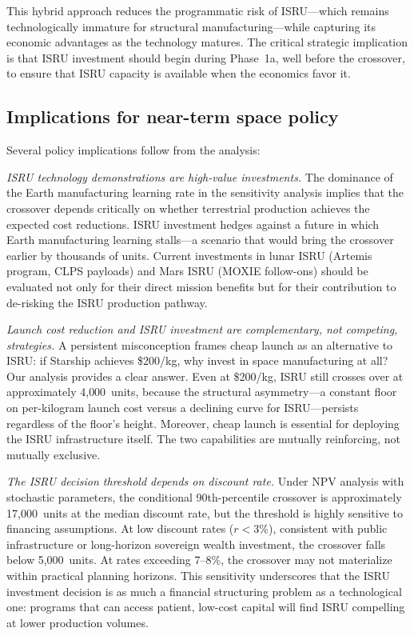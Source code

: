 \documentclass[preprint,12pt]{elsarticle}
\begin{document}
This hybrid approach reduces the programmatic risk of ISRU---which remains technologically immature for structural manufacturing---while capturing its economic advantages as the technology matures. The critical strategic implication is that ISRU investment should begin during Phase~1a, well before the crossover, to ensure that ISRU capacity is available when the economics favor it.

\subsection{Implications for near-term space policy}

Several policy implications follow from the analysis:

\emph{ISRU technology demonstrations are high-value investments.} The dominance of the Earth manufacturing learning rate in the sensitivity analysis implies that the crossover depends critically on whether terrestrial production achieves the expected cost reductions. ISRU investment hedges against a future in which Earth manufacturing learning stalls---a scenario that would bring the crossover earlier by thousands of units. Current investments in lunar ISRU (Artemis program, CLPS payloads) and Mars ISRU (MOXIE follow-ons) should be evaluated not only for their direct mission benefits but for their contribution to de-risking the ISRU production pathway.

\emph{Launch cost reduction and ISRU investment are complementary, not competing, strategies.} A persistent misconception frames cheap launch as an alternative to ISRU: if Starship achieves \$200/kg, why invest in space manufacturing at all? Our analysis provides a clear answer. Even at \$200/kg, ISRU still crosses over at approximately 4{,}000~units, because the structural asymmetry---a constant floor on per-kilogram launch cost versus a declining curve for ISRU---persists regardless of the floor's height. Moreover, cheap launch is essential for deploying the ISRU infrastructure itself. The two capabilities are mutually reinforcing, not mutually exclusive.

\emph{The ISRU decision threshold depends on discount rate.} Under NPV analysis with stochastic parameters, the conditional 90th-percentile crossover is approximately 17{,}000~units at the median discount rate, but the threshold is highly sensitive to financing assumptions. At low discount rates ($r < 3\%$), consistent with public infrastructure or long-horizon sovereign wealth investment, the crossover falls below 5{,}000~units. At rates exceeding 7--8\%, the crossover may not materialize within practical planning horizons. This sensitivity underscores that the ISRU investment decision is as much a financial structuring problem as a technological one: programs that can access patient, low-cost capital will find ISRU compelling at lower production volumes.
\end{document}

